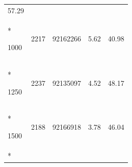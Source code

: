 \documentclass[
  12pt,
  oneside,
  openany]{book}
\begin{document}
\begin{appendices}
\begin{singlespace}
\begin{longtable}[]{@{}lllll@{}}
\begin{minipage}[t]{0.18\columnwidth}
57.29\strut
\end{minipage}\tabularnewline*
\begin{minipage}[t]{0.16\columnwidth}\raggedright
1000\strut
\end{minipage} & \begin{minipage}[t]{0.09\columnwidth}\raggedright
2217\strut
\end{minipage} & \begin{minipage}[t]{0.18\columnwidth}\raggedright
92162266\strut
\end{minipage} & \begin{minipage}[t]{0.24\columnwidth}\raggedright
5.62\strut
\end{minipage} & \begin{minipage}[t]{0.18\columnwidth}\raggedright
40.98\strut
\end{minipage}\tabularnewline*
\begin{minipage}[t]{0.16\columnwidth}\raggedright
1250\strut
\end{minipage} & \begin{minipage}[t]{0.09\columnwidth}\raggedright
2237\strut
\end{minipage} & \begin{minipage}[t]{0.18\columnwidth}\raggedright
92135097\strut
\end{minipage} & \begin{minipage}[t]{0.24\columnwidth}\raggedright
4.52\strut
\end{minipage} & \begin{minipage}[t]{0.18\columnwidth}\raggedright
48.17\strut
\end{minipage}\tabularnewline*
\begin{minipage}[t]{0.16\columnwidth}\raggedright
1500\strut
\end{minipage} & \begin{minipage}[t]{0.09\columnwidth}\raggedright
2188\strut
\end{minipage} & \begin{minipage}[t]{0.18\columnwidth}\raggedright
92166918\strut
\end{minipage} & \begin{minipage}[t]{0.24\columnwidth}\raggedright
3.78\strut
\end{minipage} & \begin{minipage}[t]{0.18\columnwidth}\raggedright
46.04\strut
\end{minipage}\tabularnewline*
\begin{minipage}[t]{0.16\columnwidth}\raggedright

\end{minipage}
\end{longtable}
\end{singlespace}
\end{appendices}
\end{document}
